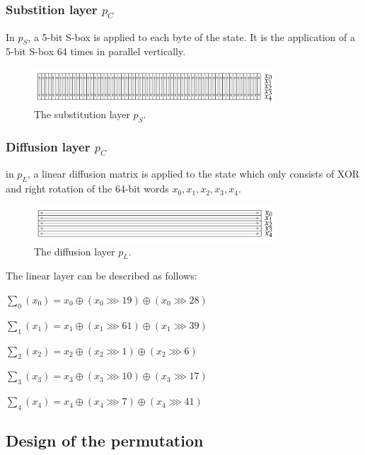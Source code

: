 \documentclass{article}
\begin{document}
\subsubsection{Substition layer $p_C$}
In $p_S$, a 5-bit S-box is applied to each byte of the state. It is the application of a 5-bit S-box 64 times in parallel vertically. \cite{ascon_specification, analysis_of_ascon}

\begin{figure}[htbp]
  \centering
  \includegraphics[width=0.8\textwidth]{images/substitution.png}
  \caption{The substitution layer $p_S$.}
  \label{fig:substition}
\end{figure}

\subsubsection{Diffusion layer $p_C$}
in $p_L$, a linear diffusion matrix is applied to the state which only consists of XOR and right rotation of the 64-bit words $x_0, x_1, x_2, x_3, x_4$. \cite{ascon_specification, analysis_of_ascon}

\begin{figure}[htbp]
  \centering
  \includegraphics[width=0.8\textwidth]{images/diffusion.png}
  \caption{The diffusion layer $p_L$.}
  \label{fig:diffusion}
\end{figure}

The linear layer can be described as follows:


$\sum_0 (x_0) = x_0 \oplus (x_0 \ggg 19) \oplus (x_0 \ggg 28)$

$\sum_1 (x_1) = x_1 \oplus (x_1 \ggg 61) \oplus (x_1 \ggg 39)$

$\sum_2 (x_2) = x_2 \oplus (x_2 \ggg 1) \oplus (x_2 \ggg 6)$

$\sum_3 (x_3) = x_3 \oplus (x_3 \ggg 10) \oplus (x_3 \ggg 17)$

$\sum_4 (x_4) = x_4 \oplus (x_4 \ggg 7) \oplus (x_4 \ggg 41)$ 

\cite{ascon_specification,analysis_of_ascon}


\subsection{Design of the permutation}
\end{document}
